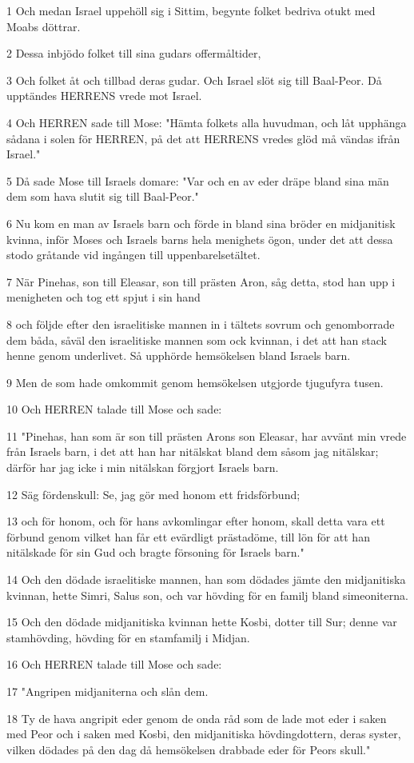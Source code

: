 \par 1 Och medan Israel uppehöll sig i Sittim, begynte folket bedriva otukt med Moabs döttrar.
\par 2 Dessa inbjödo folket till sina gudars offermåltider,
\par 3 Och folket åt och tillbad deras gudar. Och Israel slöt sig till Baal-Peor. Då upptändes HERRENS vrede mot Israel.
\par 4 Och HERREN sade till Mose: "Hämta folkets alla huvudman, och låt upphänga sådana i solen för HERREN, på det att HERRENS vredes glöd må vändas ifrån Israel."
\par 5 Då sade Mose till Israels domare: "Var och en av eder dräpe bland sina män dem som hava slutit sig till Baal-Peor."
\par 6 Nu kom en man av Israels barn och förde in bland sina bröder en midjanitisk kvinna, inför Moses och Israels barns hela menighets ögon, under det att dessa stodo gråtande vid ingången till uppenbarelsetältet.
\par 7 När Pinehas, son till Eleasar, son till prästen Aron, såg detta, stod han upp i menigheten och tog ett spjut i sin hand
\par 8 och följde efter den israelitiske mannen in i tältets sovrum och genomborrade dem båda, såväl den israelitiske mannen som ock kvinnan, i det att han stack henne genom underlivet. Så upphörde hemsökelsen bland Israels barn.
\par 9 Men de som hade omkommit genom hemsökelsen utgjorde tjugufyra tusen.
\par 10 Och HERREN talade till Mose och sade:
\par 11 "Pinehas, han som är son till prästen Arons son Eleasar, har avvänt min vrede från Israels barn, i det att han har nitälskat bland dem såsom jag nitälskar; därför har jag icke i min nitälskan förgjort Israels barn.
\par 12 Säg fördenskull: Se, jag gör med honom ett fridsförbund;
\par 13 och för honom, och för hans avkomlingar efter honom, skall detta vara ett förbund genom vilket han får ett evärdligt prästadöme, till lön för att han nitälskade för sin Gud och bragte försoning för Israels barn."
\par 14 Och den dödade israelitiske mannen, han som dödades jämte den midjanitiska kvinnan, hette Simri, Salus son, och var hövding för en familj bland simeoniterna.
\par 15 Och den dödade midjanitiska kvinnan hette Kosbi, dotter till Sur; denne var stamhövding, hövding för en stamfamilj i Midjan.
\par 16 Och HERREN talade till Mose och sade:
\par 17 "Angripen midjaniterna och slån dem.
\par 18 Ty de hava angripit eder genom de onda råd som de lade mot eder i saken med Peor och i saken med Kosbi, den midjanitiska hövdingdottern, deras syster, vilken dödades på den dag då hemsökelsen drabbade eder för Peors skull."

